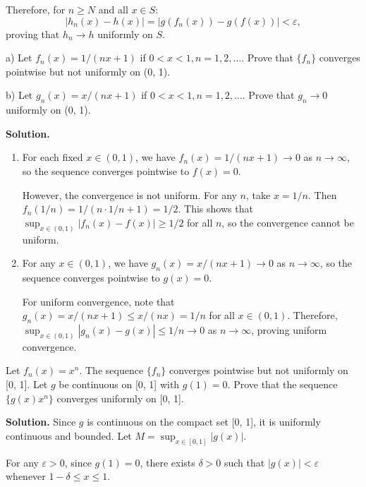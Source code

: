 Therefore, for \( n \geq N \) and all \( x \in S \):
\[|h_n(x) - h(x)| = |g(f_n(x)) - g(f(x))| < \varepsilon,\]
proving that \( h_n \to h \) uniformly on \( S \).

\begin{problembox}
a) Let \( f_n(x) = 1/(nx + 1) \) if \( 0 < x < 1, n = 1, 2, \ldots \). Prove that \( \{f_n\} \) converges pointwise but not uniformly on (0, 1).

b) Let \( g_n(x) = x/(nx + 1) \) if \( 0 < x < 1, n = 1, 2, \ldots \). Prove that \( g_n \to 0 \) uniformly on (0, 1).
\end{problembox}

\noindent\textbf{Solution.}
\begin{enumerate}[label=(\alph*)]
\item For each fixed \( x \in (0, 1) \), we have \( f_n(x) = 1/(nx + 1) \to 0 \) as \( n \to \infty \), so the sequence converges pointwise to \( f(x) = 0 \).

However, the convergence is not uniform. For any \( n \), take \( x = 1/n \). Then \( f_n(1/n) = 1/(n \cdot 1/n + 1) = 1/2 \). This shows that \( \sup_{x \in (0,1)} |f_n(x) - f(x)| \geq 1/2 \) for all \( n \), so the convergence cannot be uniform.

\item For any \( x \in (0, 1) \), we have \( g_n(x) = x/(nx + 1) \to 0 \) as \( n \to \infty \), so the sequence converges pointwise to \( g(x) = 0 \).

For uniform convergence, note that \( g_n(x) = x/(nx + 1) \leq x/(nx) = 1/n \) for all \( x \in (0, 1) \). Therefore, \( \sup_{x \in (0,1)} |g_n(x) - g(x)| \leq 1/n \to 0 \) as \( n \to \infty \), proving uniform convergence.
\end{enumerate}

\begin{problembox}
Let \( f_n(x) = x^n \). The sequence \( \{f_n\} \) converges pointwise but not uniformly on [0, 1]. Let \( g \) be continuous on [0, 1] with \( g(1) = 0 \). Prove that the sequence \( \{g(x)x^n\} \) converges uniformly on [0, 1].
\end{problembox}

\noindent\textbf{Solution.} Since \( g \) is continuous on the compact set [0, 1], it is uniformly continuous and bounded. Let \( M = \sup_{x \in [0,1]} |g(x)| \).

For any \( \varepsilon > 0 \), since \( g(1) = 0 \), there exists \( \delta > 0 \) such that \( |g(x)| < \varepsilon \) whenever \( 1 - \delta \leq x \leq 1 \).


